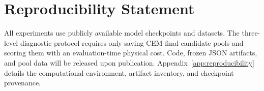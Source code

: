 \documentclass{article}
\begin{document}
\section*{Reproducibility Statement}
All experiments use publicly available model checkpoints and datasets. The three-level diagnostic protocol requires only saving CEM final candidate pools and scoring them with an evaluation-time physical cost. Code, frozen JSON artifacts, and pool data will be released upon publication. Appendix~\ref{app:reproducibility} details the computational environment, artifact inventory, and checkpoint provenance.




\newpage
\appendix










\end{document}
